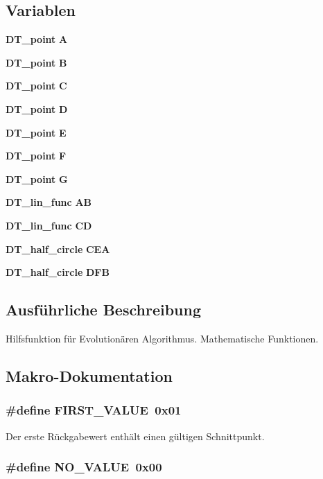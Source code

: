 \subsection*{Variablen}
\begin{DoxyCompactItemize}
\item 
{\bf DT\_\-point} {\bf A}
\item 
{\bf DT\_\-point} {\bf B}
\item 
{\bf DT\_\-point} {\bf C}
\item 
{\bf DT\_\-point} {\bf D}
\item 
{\bf DT\_\-point} {\bf E}
\item 
{\bf DT\_\-point} {\bf F}
\item 
{\bf DT\_\-point} {\bf G}
\item 
{\bf DT\_\-lin\_\-func} {\bf AB}
\item 
{\bf DT\_\-lin\_\-func} {\bf CD}
\item 
{\bf DT\_\-half\_\-circle} {\bf CEA}
\item 
{\bf DT\_\-half\_\-circle} {\bf DFB}
\end{DoxyCompactItemize}


\subsection{Ausführliche Beschreibung}
Hilfsfunktion für Evolutionären Algorithmus. Mathematische Funktionen. 

\subsection{Makro-\/Dokumentation}
\subsubsection[{FIRST\_\-VALUE}]{\setlength{\rightskip}{0pt plus 5cm}\#define FIRST\_\-VALUE~0x01}\label{evolutionary_helper_8c_a0b9925c98f366600fadd635ddbb68373}


Der erste Rückgabewert enthält einen gültigen Schnittpunkt. 

\subsubsection[{NO\_\-VALUE}]{\setlength{\rightskip}{0pt plus 5cm}\#define NO\_\-VALUE~0x00}\label{evolutionary_helper_8c_a0215deb9808d56a77e0372195607f52e}


